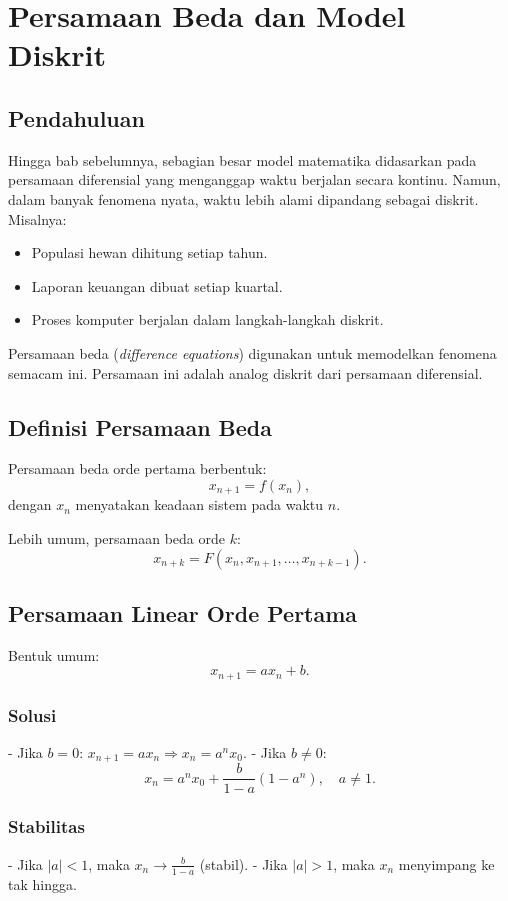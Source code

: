 \documentclass{bukumjh}
\begin{document}
\chapter{Persamaan Beda dan Model Diskrit}

\section{Pendahuluan}
Hingga bab sebelumnya, sebagian besar model matematika didasarkan pada persamaan diferensial yang menganggap waktu berjalan secara kontinu. Namun, dalam banyak fenomena nyata, waktu lebih alami dipandang sebagai {\jsg diskrit}. Misalnya:
\begin{itemize}
    \item Populasi hewan dihitung setiap tahun.
    \item Laporan keuangan dibuat setiap kuartal.
    \item Proses komputer berjalan dalam langkah-langkah diskrit.
\end{itemize}

{\jsg Persamaan beda} (\textit{difference equations}) digunakan untuk memodelkan fenomena semacam ini. Persamaan ini adalah analog diskrit dari persamaan diferensial.

\section{Definisi Persamaan Beda}
Persamaan beda orde pertama berbentuk:
\[
x_{n+1} = f(x_n),
\]
dengan $x_n$ menyatakan keadaan sistem pada waktu $n$.  

Lebih umum, persamaan beda orde $k$:
\[
x_{n+k} = F(x_n, x_{n+1}, \dots, x_{n+k-1}).
\]

\section{Persamaan Linear Orde Pertama}
Bentuk umum:
\[
x_{n+1} = ax_n + b.
\]

\subsection{Solusi}
- Jika $b=0$: $x_{n+1} = ax_n \Rightarrow x_n = a^n x_0$.  
- Jika $b \neq 0$:  
\[
x_n = a^n x_0 + \frac{b}{1-a}(1-a^n), \quad a \neq 1.
\]

\subsection{Stabilitas}
- Jika $|a|<1$, maka $x_n \to \frac{b}{1-a}$ (stabil).  
- Jika $|a|>1$, maka $x_n$ menyimpang ke tak hingga.  
\end{document}
